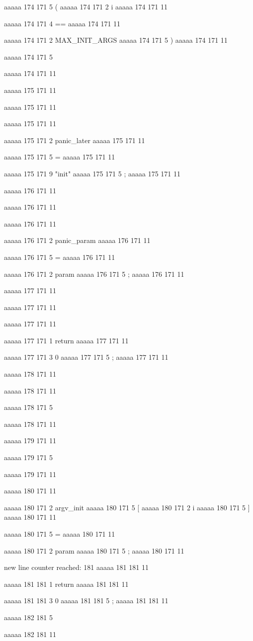 {{aaaaa 174 171
5
(
aaaaa 174 171
2
i
aaaaa 174 171
11
 
aaaaa 174 171
4
==
aaaaa 174 171
11
 
aaaaa 174 171
2
MAX_INIT_ARGS
aaaaa 174 171
5
)
aaaaa 174 171
11
 
aaaaa 174 171
5
{
aaaaa 174 171
11


aaaaa 175 171
11
	
aaaaa 175 171
11
	
aaaaa 175 171
11
	
aaaaa 175 171
2
panic_later
aaaaa 175 171
11
 
aaaaa 175 171
5
=
aaaaa 175 171
11
 
aaaaa 175 171
9
"init"
aaaaa 175 171
5
;
aaaaa 175 171
11


aaaaa 176 171
11
	
aaaaa 176 171
11
	
aaaaa 176 171
11
	
aaaaa 176 171
2
panic_param
aaaaa 176 171
11
 
aaaaa 176 171
5
=
aaaaa 176 171
11
 
aaaaa 176 171
2
param
aaaaa 176 171
5
;
aaaaa 176 171
11


aaaaa 177 171
11
	
aaaaa 177 171
11
	
aaaaa 177 171
11
	
aaaaa 177 171
1
return
aaaaa 177 171
11
 
aaaaa 177 171
3
0
aaaaa 177 171
5
;
aaaaa 177 171
11


aaaaa 178 171
11
	
aaaaa 178 171
11
	
aaaaa 178 171
5
}
aaaaa 178 171
11


aaaaa 179 171
11
	
aaaaa 179 171
5
}
aaaaa 179 171
11


aaaaa 180 171
11
	
aaaaa 180 171
2
argv_init
aaaaa 180 171
5
[
aaaaa 180 171
2
i
aaaaa 180 171
5
]
aaaaa 180 171
11
 
aaaaa 180 171
5
=
aaaaa 180 171
11
 
aaaaa 180 171
2
param
aaaaa 180 171
5
;
aaaaa 180 171
11


new line counter reached: 181
aaaaa 181 181
11
	
aaaaa 181 181
1
return
aaaaa 181 181
11
 
aaaaa 181 181
3
0
aaaaa 181 181
5
;
aaaaa 181 181
11


aaaaa 182 181
5
}
aaaaa 182 181
11


